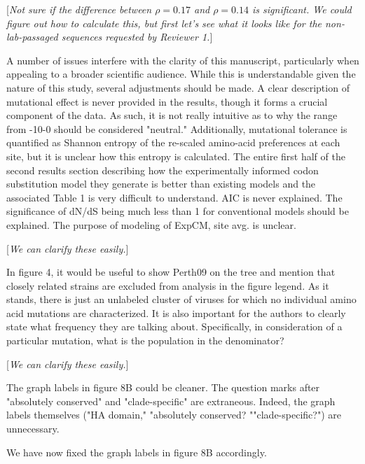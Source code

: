 \documentclass[11pt, oneside]{article}   	%
\newcommand{\comment}[1]{{\color{red}[\textsl{#1}]}}
\newcommand{\response}[1]{{\color{black}#1}}
\begin{document}
\comment{Not sure if the difference between $\rho = 0.17$ and $\rho = 0.14$ is significant. 
We could figure out how to calculate this, but first let's see what it looks like for the non-lab-passaged sequences requested by Reviewer 1.}

A number of issues interfere with the clarity of this manuscript, particularly when appealing to a broader scientific audience. While this is understandable given the nature of this study, several adjustments should be made. A clear description of mutational effect is never provided in the results, though it forms a crucial component of the data. As such, it is not really intuitive as to why the range from -10-0 should be considered "neutral." Additionally, mutational tolerance is quantified as Shannon entropy of the re-scaled amino-acid preferences at each site, but it is unclear how this entropy is calculated. The entire first half of the second results section describing how the experimentally informed codon substitution model they generate is better than existing models and the associated Table 1 is very difficult to understand. AIC is never explained. The significance of dN/dS being much less than 1 for conventional models should be explained. The purpose of modeling of ExpCM, site avg. is unclear. 

\comment{We can clarify these easily.}

In figure 4, it would be useful to show Perth09 on the tree and mention that closely related strains are excluded from analysis in the figure legend. As it stands, there is just an unlabeled cluster of viruses for which no individual amino acid mutations are characterized. It is also important for the authors to clearly state what frequency they are talking about. Specifically, in consideration of a particular mutation, what is the population in the denominator? 

\comment{We can clarify these easily.}

The graph labels in figure 8B could be cleaner. The question marks after "absolutely conserved" and "clade-specific" are extraneous. Indeed, the graph labels themselves ("HA domain," "absolutely conserved? ""clade-specific?") are unnecessary. 

\response{We have now fixed the graph labels in figure 8B accordingly.}
\end{document}
